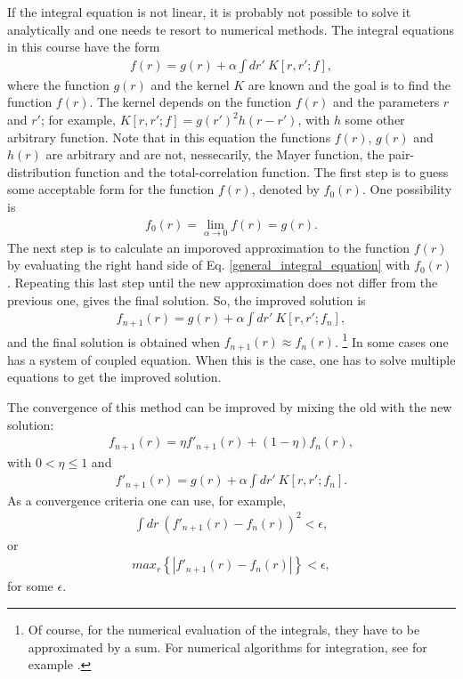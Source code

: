 
If the integral equation is not linear, it is probably not
possible to solve it analytically and one needs te resort to 
numerical methods.
The integral equations in this course have the form
\begin{align}\label{general_integral_equation}
f(r) = g(r) + \alpha \int dr'~K[r,r';f],
\end{align}
where the function $g(r)$ and the kernel $K$ are known
and the goal is to find the function $f(r)$.
The kernel depends on the function $f(r)$ and the parameters $r$ and $r'$;
for example, $K[r,r';f] = g(r')^2 h(r-r')$, with $h$ some other arbitrary function.
Note that in this equation the functions $f(r)$, $g(r)$ and $h(r)$ are arbitrary and are not, nessecarily, the Mayer function,
the pair-distribution function and the total-correlation function.
The first step is to guess some acceptable form for the 
function $f(r)$, denoted by $f_0(r)$.
One possibility is
\begin{align}
f_0(r) = \lim_{\alpha \to 0} f(r) = g(r).
\end{align}
The next step is to calculate an imporoved approximation
to the function $f(r)$ by evaluating the right hand side of
Eq. \eqref{general_integral_equation} with $f_0(r)$.
Repeating this last step until the new approximation does not
differ from the previous one, gives the final solution.
So, the improved solution is
\begin{align}
f_{n+1}(r) = g(r) + \alpha \int dr'~K[r,r';f_n],
\end{align}
and the final solution is obtained when $f_{n+1}(r) \approx f_n(r)$.
\footnote{Of course, for the numerical evaluation of the integrals, they have to be approximated by a sum.
For numerical algorithms for integration, see for example
\cite{press1992numerical}.}
In some cases one has a system of coupled equation.
When this is the case, one has to solve multiple equations
to get the improved solution.

The convergence of this method can be improved by mixing the old with the new solution:
\begin{align}
f_{n+1}(r) = \eta f'_{n+1}(r) + (1-\eta) f_n(r),
\end{align}
with $0 < \eta \leq 1$ and 
\begin{align}
f'_{n+1}(r) = g(r) + \alpha \int dr'~K[r,r';f_n].
\end{align}
As a convergence criteria one can use, for example,
\begin{align}
\int dr~\left( f'_{n+1}(r) - f_n(r) \right)^2 < \epsilon,
\end{align}
or
\begin{align}
max_r \left\{ | f'_{n+1}(r) - f_n(r) | \right\} < \epsilon,
\end{align}
for some $\epsilon$.


